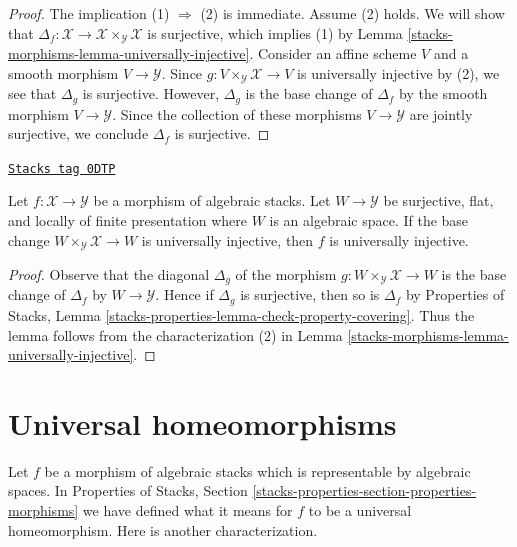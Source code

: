 \begin{proof}
The implication (1) $\Rightarrow$ (2) is immediate.
Assume (2) holds. We will show that
$\Delta_f : \mathcal{X} \to \mathcal{X} \times_\mathcal{Y} \mathcal{X}$
is surjective, which implies (1) by Lemma \ref{stacks-morphisms-lemma-universally-injective}.
Consider an affine scheme $V$ and a smooth morphism
$V \to \mathcal{Y}$. Since
$g : V \times_\mathcal{Y} \mathcal{X} \to V$
is universally injective by (2), we see that
$\Delta_g$ is surjective.
However, $\Delta_g$ is the base change of $\Delta_f$
by the smooth morphism $V \to \mathcal{Y}$.
Since the collection of these morphisms $V \to \mathcal{Y}$
are jointly surjective, we conclude $\Delta_f$ is surjective.
\end{proof}

\begin{lemma}
\label{stacks-morphisms-lemma-check-universally-injective-covering}
\href{https://stacks.math.columbia.edu/tag/0DTP}{\texttt{Stacks tag 0DTP}}

Let $f : \mathcal{X} \to \mathcal{Y}$ be a morphism of algebraic stacks.
Let $W \to \mathcal{Y}$ be surjective, flat, and locally of finite
presentation where $W$ is an algebraic space. If the base change
$W \times_\mathcal{Y} \mathcal{X} \to W$ is universally injective,
then $f$ is universally injective.
\end{lemma}

\begin{proof}
Observe that the diagonal $\Delta_g$ of the morphism
$g : W \times_\mathcal{Y} \mathcal{X} \to W$
is the base change of $\Delta_f$ by $W \to \mathcal{Y}$.
Hence if $\Delta_g$ is surjective, then so is $\Delta_f$
by Properties of Stacks, Lemma
\ref{stacks-properties-lemma-check-property-covering}.
Thus the lemma follows from the characterization (2)
in Lemma \ref{stacks-morphisms-lemma-universally-injective}.
\end{proof}

\section{Universal homeomorphisms}
\label{stacks-morphisms-section-universal-homeomorphisms}
Let $f$ be a morphism of algebraic stacks which is representable by
algebraic spaces. In
Properties of Stacks, Section
\ref{stacks-properties-section-properties-morphisms}
we have defined what it means for $f$ to be a universal homeomorphism.
Here is another characterization.

